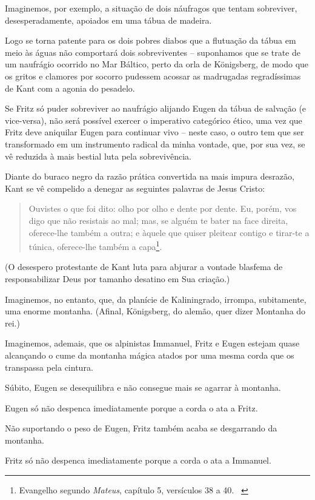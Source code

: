 Imaginemos, por exemplo, a situação de dois náufragos que tentam
sobreviver, desesperadamente, apoiados em uma tábua de madeira.

Logo se torna patente para os dois pobres diabos que a flutuação da
tábua em meio às águas não comportará dois sobreviventes -- suponhamos
que se trate de um naufrágio ocorrido no Mar Báltico, perto da orla de
Königsberg, de modo que os gritos e clamores por socorro pudessem
acossar as madrugadas regradíssimas de Kant com a agonia do pesadelo.

Se Fritz só puder sobreviver ao naufrágio alijando Eugen da tábua de
salvação (e vice-versa), não será possível exercer o imperativo
categórico ético, uma vez que Fritz deve aniquilar Eugen para continuar
vivo -- neste caso, o outro tem que ser transformado em um instrumento
radical da minha vontade, que, por sua vez, se vê reduzida à mais
bestial luta pela sobrevivência.

Diante do buraco negro da razão prática convertida na mais impura
desrazão, Kant se vê compelido a denegar as seguintes palavras de Jesus
Cristo:

\begin{quote}
Ouvistes o que foi dito: olho por olho e dente por dente. Eu, porém, vos
digo que não resistais ao mal; mas, se alguém te bater na face direita,
oferece-lhe também a outra; e àquele que quiser pleitear contigo e
tirar-te a túnica, oferece-lhe também a capa\footnote{Evangelho segundo
  \emph{Mateus}, capítulo 5, versículos 38 a 40. ~}.
\end{quote}

(O desespero protestante de Kant luta para abjurar a vontade blasfema de
responsabilizar Deus por tamanho desatino em Sua criação.)

Imaginemos, no entanto, que, da planície de Kaliningrado, irrompa,
subitamente, uma enorme montanha. (Afinal, Königsberg, do alemão, quer
dizer Montanha do rei.)

Imaginemos, ademais, que os alpinistas Immanuel, Fritz e Eugen estejam
quase alcançando o cume da montanha mágica atados por uma mesma corda
que os transpassa pela cintura.

Súbito, Eugen se desequilibra e não consegue mais se agarrar à montanha.

Eugen só não despenca imediatamente porque a corda o ata a Fritz.

Não suportando o peso de Eugen, Fritz também acaba se desgarrando da
montanha.

Fritz só não despenca imediatamente porque a corda o ata a Immanuel.

